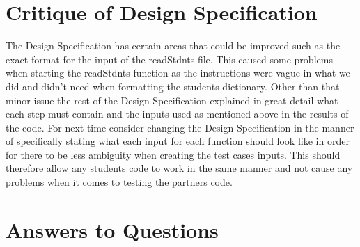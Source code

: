\documentclass[12pt]{article}
\begin{document}
\section{Critique of Design Specification}
The Design Specification has certain areas that could be improved such as the exact format for the input of the readStdnts file. This caused some problems when starting the readStdnts function as the instructions were vague in what we did and didn't need when formatting the students dictionary. Other than that minor issue the rest of the Design Specification explained in great detail what each step must contain and the inputs used as mentioned above in the results of the code.  For next time consider changing the Design Specification in the manner of specifically stating what each input for each function should look like in order for there to be less ambiguity when creating the test cases inputs. This should therefore allow any students code to work in the same manner and not cause any problems when it comes to testing the partners code.


\section{Answers to Questions}
\end{document}
